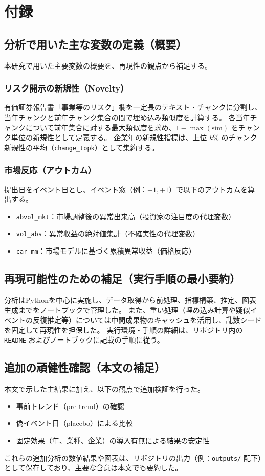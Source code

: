 \chapter{付録}

\section{分析で用いた主な変数の定義（概要）}
本研究で用いた主要変数の概要を、再現性の観点から補足する。

\subsection{リスク開示の新規性（Novelty）}
有価証券報告書「事業等のリスク」欄を一定長のテキスト・チャンクに分割し、当年チャンクと前年チャンク集合の間で埋め込み類似度を計算する。
各当年チャンクについて前年集合に対する最大類似度を求め、\(1-\max(\mathrm{sim})\) をチャンク単位の新規性として定義する。
企業年の新規性指標は、上位 \(k\%\) のチャンク新規性の平均（\texttt{change\_topk}）として集約する。

\subsection{市場反応（アウトカム）}
提出日をイベント日とし、イベント窓（例：\(-1,+1\)）で以下のアウトカムを算出する。

\begin{itemize}
  \item \texttt{abvol\_mkt}：市場調整後の異常出来高（投資家の注目度の代理変数）
  \item \texttt{vol\_abs}：異常収益の絶対値集計（不確実性の代理変数）
  \item \texttt{car\_mm}：市場モデルに基づく累積異常収益（価格反応）
\end{itemize}

\section{再現可能性のための補足（実行手順の最小要約）}
分析はPythonを中心に実施し、データ取得から前処理、指標構築、推定、図表生成までをノートブックで管理した。
また、重い処理（埋め込み計算や疑似イベントの反復推定等）については中間成果物のキャッシュを活用し、乱数シードを固定して再現性を担保した。
実行環境・手順の詳細は、リポジトリ内の \texttt{README} およびノートブックに記載の手順に従う。

\section{追加の頑健性確認（本文の補足）}
本文で示した主結果に加え、以下の観点で追加検証を行った。

\begin{itemize}
  \item 事前トレンド（pre-trend）の確認
  \item 偽イベント日（placebo）による比較
  \item 固定効果（年、業種、企業）の導入有無による結果の安定性
\end{itemize}

これらの追加分析の数値結果や図表は、リポジトリの出力（例：\texttt{outputs/} 配下）として保存しており、主要な含意は本文でも要約した。


